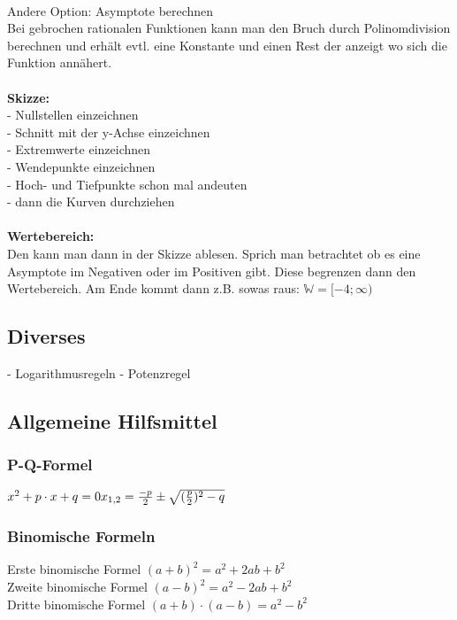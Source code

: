 \documentclass[6pt,a4paper]{scrartcl}
\begin{document}
\begin{multicols*}{2}
\\
Andere Option: Asymptote berechnen\\
Bei gebrochen rationalen Funktionen kann man den Bruch durch Polinomdivision berechnen und erhält evtl. eine Konstante und einen Rest der anzeigt wo sich die Funktion annähert.\\
\\
\textbf{Skizze:}\\
- Nullstellen einzeichnen\\
- Schnitt mit der y-Achse einzeichnen\\
- Extremwerte einzeichnen\\
- Wendepunkte einzeichnen\\
- Hoch- und Tiefpunkte schon mal andeuten\\
- dann die Kurven durchziehen\\
\\
\textbf{Wertebereich:}\\
Den kann man dann in der Skizze ablesen. Sprich man betrachtet ob es eine Asymptote im Negativen oder im Positiven gibt. Diese begrenzen dann den Wertebereich. Am Ende kommt dann z.B. sowas raus: $\mathbb{W} = [-4; \infty)$
\subsection{Diverses}
- Logarithmusregeln
- Potenzregel

\subsection{Allgemeine Hilfsmittel}
\subsubsection{P-Q-Formel}
$
x^2 + p\cdot x + q = 0\\
{x}_{1,2} = \frac{-p}{2} \pm \sqrt{(\frac{p}{2})^2 - q}
$
\subsubsection{Binomische Formeln}
Erste binomische Formel $(a+b)^{2}=a^{2} + 2ab + b^{2}$ \\
Zweite binomische Formel $(a-b)^{2}=a^{2} - 2ab + b^{2}$ \\
Dritte binomische Formel $(a+b)\cdot (a-b)=a^{2}-b^{2}$ \\


\end{multicols*}


\end{document}
